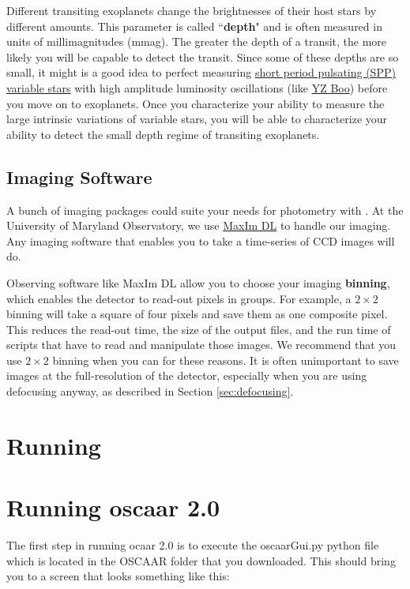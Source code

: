 \documentclass{article}
\begin{document}
Different transiting exoplanets change the brightnesses of their host stars by different amounts. This parameter is called ``\textbf{depth}" and is often measured in units of millimagnitudes (mmag). The greater the depth of a transit, the more likely you will be capable to detect the transit. Since some of these depths are so small, it might is a good idea to perfect measuring \href{https://sites.google.com/site/aavsosppsection/}{short period pulsating (SPP) variable stars} with high amplitude luminosity oscillations (like \href{http://www.aavso.org/vsx/index.php?view=detail.top&oid=4356}{YZ Boo}) before you move on to exoplanets. Once you characterize your ability to measure the large intrinsic variations of variable stars, you will be able to characterize your ability to detect the small depth regime of transiting exoplanets. 

\subsection{Imaging Software}
A bunch of imaging packages could suite your needs for photometry with \oscaar. At the University of Maryland Observatory, we use \href{http://www.cyanogen.com/maxim_main.php}{MaxIm DL} to handle our imaging. Any imaging software that enables you to take a time-series of CCD images will do. 

Observing software like MaxIm DL allow you to choose your imaging \textbf{binning}, which enables the detector to read-out pixels in groups. For example, a $2\times2$ binning will take a square of four pixels and save them as one composite pixel. This reduces the read-out time, the size of the output files, and the run time of scripts that have to read and manipulate those images. We recommend that you use $2\times2$ binning when you can for these reasons. It is often unimportant to save images at the full-resolution of the detector, especially when you are using defocusing anyway, as described in Section \ref{sec:defocusing}. 

\section{Running \oscaar} \label{sec:run}

\section{Running oscaar 2.0}

The first step in running ocaar 2.0 is to execute the oscaarGui.py python file which is located in the OSCAAR folder that you downloaded. This should bring you to a screen that looks something like this:
\end{document}
